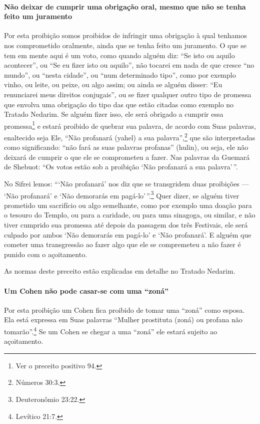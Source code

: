 \paragraph{Não deixar de cumprir uma obrigação oral, mesmo que não se tenha
feito um juramento}

Por esta proibição somos proibidos de infringir uma obrigação à qual
tenhamos nos comprometido oralmente, ainda que se tenha feito um
juramento. O que se tem em mente aqui é um voto, como quando alguém
diz: ``Se isto ou aquilo acontecer'', ou ``Se eu fizer isto ou aquilo'',
não tocarei em nada de que cresce ``no mundo'', ou ``nesta cidade'', ou
``num determinado tipo'', como por exemplo vinho, ou leite, ou peixe, ou algo assim; ou ainda se alguém
disser: ``Eu renunciarei meus direitos conjugais'', ou se fizer
qualquer outro tipo de promessa que envolva uma obrigação do tipo das
que estão citadas como exemplo no Tratado Nedarim. Se alguém fizer isso,
ele será obrigado a cumprir essa promessa\footnote{Ver o preceito positivo 94.} e estará
proibido de quebrar sua palavra, de acordo com Suas palavras, enaltecido
seja Ele, ``Não profanará (yahel) a sua palavra'',\footnote{Números 30:3.} que
são interpretadas como significando: ``não fará as suas palavras
profanas'' (hulin), ou seja, ele não deixará de cumprir o que ele se
comprometeu a fazer. Nas palavras da Guemará de Shebuot: ``Os votos
estão sob a proibição `Não profanará a sua palavra'\,''.

No Sifrei lemos: ```Não profanará' nos diz que se transgridem duas
proibições --- `Não profanará' e `Não demorarás em pagá-lo'\,''.\footnote{Deuteronômio 23:22.} Quer dizer, se alguém tiver prometido um
sacrifício ou algo semelhante, como por exemplo uma doação para o
tesouro do Templo, ou para a caridade, ou para uma sinagoga, ou similar,
e não tiver cumprido sua promessa até depois da passagem dos três
Festivais, ele será culpado por ambos `Não demorarás em pagá-lo' e `Não
profanará'. E alguém que cometer uma transgressão ao fazer algo que ele
se compremeteu a não fazer é punido com o açoitamento.

As normas deste preceito estão explicadas em detalhe no Tratado Nedarim.

\paragraph{Um Cohen não pode casar-se com uma ``zoná''}

Por esta proibição um Cohen fica proibido de tomar uma ``zoná'' como
esposa. Ela está expressa em Suas palavras ``Mulher prostituta (zoná) ou
profana não tomarão''.\footnote{Levítico 21:7.} Se um Cohen se chegar a uma
``zoná'' ele estará sujeito ao açoitamento.

